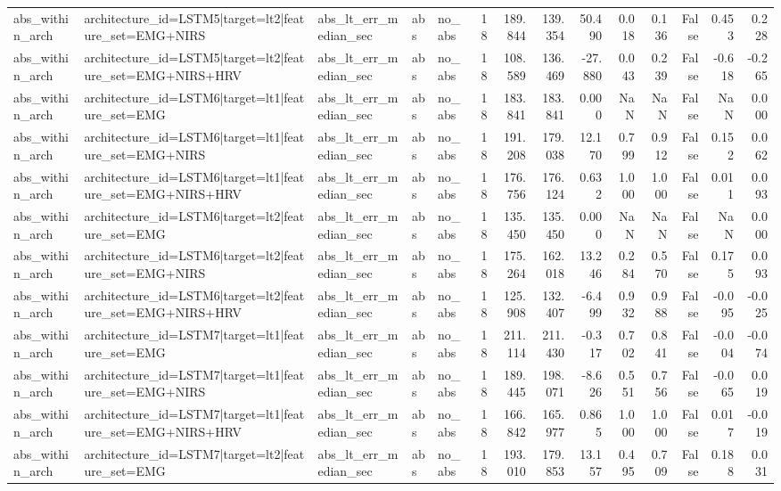 \begin{table}
\begin{tabular}{lllllrrrrrrrrr}
abs_within_arch & architecture_id=LSTM5|target=lt2|feature_set=EMG+NIRS & abs_lt_err_median_sec & abs & no_abs & 18 & 189.844 & 139.354 & 50.490 & 0.018 & 0.136 & False & 0.453 & 0.228 \\
abs_within_arch & architecture_id=LSTM5|target=lt2|feature_set=EMG+NIRS+HRV & abs_lt_err_median_sec & abs & no_abs & 18 & 108.589 & 136.469 & -27.880 & 0.043 & 0.239 & False & -0.618 & -0.265 \\
abs_within_arch & architecture_id=LSTM6|target=lt1|feature_set=EMG & abs_lt_err_median_sec & abs & no_abs & 18 & 183.841 & 183.841 & 0.000 & NaN & NaN & False & NaN & 0.000 \\
abs_within_arch & architecture_id=LSTM6|target=lt1|feature_set=EMG+NIRS & abs_lt_err_median_sec & abs & no_abs & 18 & 191.208 & 179.038 & 12.170 & 0.799 & 0.912 & False & 0.152 & 0.062 \\
abs_within_arch & architecture_id=LSTM6|target=lt1|feature_set=EMG+NIRS+HRV & abs_lt_err_median_sec & abs & no_abs & 18 & 176.756 & 176.124 & 0.632 & 1.000 & 1.000 & False & 0.011 & 0.093 \\
abs_within_arch & architecture_id=LSTM6|target=lt2|feature_set=EMG & abs_lt_err_median_sec & abs & no_abs & 18 & 135.450 & 135.450 & 0.000 & NaN & NaN & False & NaN & 0.000 \\
abs_within_arch & architecture_id=LSTM6|target=lt2|feature_set=EMG+NIRS & abs_lt_err_median_sec & abs & no_abs & 18 & 175.264 & 162.018 & 13.246 & 0.284 & 0.570 & False & 0.175 & 0.093 \\
abs_within_arch & architecture_id=LSTM6|target=lt2|feature_set=EMG+NIRS+HRV & abs_lt_err_median_sec & abs & no_abs & 18 & 125.908 & 132.407 & -6.499 & 0.932 & 0.988 & False & -0.095 & -0.025 \\
abs_within_arch & architecture_id=LSTM7|target=lt1|feature_set=EMG & abs_lt_err_median_sec & abs & no_abs & 18 & 211.114 & 211.430 & -0.317 & 0.702 & 0.841 & False & -0.004 & -0.074 \\
abs_within_arch & architecture_id=LSTM7|target=lt1|feature_set=EMG+NIRS & abs_lt_err_median_sec & abs & no_abs & 18 & 189.445 & 198.071 & -8.626 & 0.551 & 0.756 & False & -0.065 & 0.019 \\
abs_within_arch & architecture_id=LSTM7|target=lt1|feature_set=EMG+NIRS+HRV & abs_lt_err_median_sec & abs & no_abs & 18 & 166.842 & 165.977 & 0.865 & 1.000 & 1.000 & False & 0.017 & -0.019 \\
abs_within_arch & architecture_id=LSTM7|target=lt2|feature_set=EMG & abs_lt_err_median_sec & abs & no_abs & 18 & 193.010 & 179.853 & 13.157 & 0.495 & 0.709 & False & 0.188 & 0.031 \\

\end{tabular}
\end{table}
